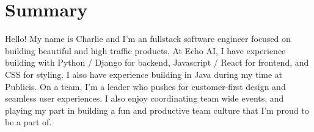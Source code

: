 \documentclass[letterpaper,11pt]{article}
\begin{document}



\section{Summary}
    {
        Hello! My name is Charlie and I'm an fullstack software engineer focused on building beautiful and high traffic products.
        At Echo AI, I have experience building with Python / Django for backend, Javascript / React for frontend, and CSS for styling.
        I also have experience building in Java during my time at Publicis.
        On a team, I'm a leader who pushes for customer-first design and seamless user experiences.
        I also enjoy coordinating team wide events, and playing my part in building a fun and productive team culture that I'm proud to be a part of.
    }

\end{document}
